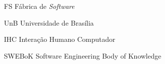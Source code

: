 \begin{siglas}
  \item[FS] Fábrica de \textit{Software}
  \item[UnB] Universidade de Brasília
  \item[IHC] Interação Humano Computador
  \item[SWEBoK] Software Engineering Body of Knowledge
\end{siglas}
